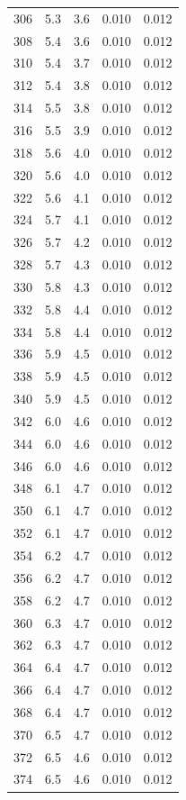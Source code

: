\documentclass[10pt,twocolumn]{article}
\begin{document}
\begin{table}[!t]
\begin{minipage}[t]{0.48\textwidth}
\begin{tabular}{ccccc}
306 & 5.3 & 3.6 & 0.010 & 0.012 \\
308 & 5.4 & 3.6 & 0.010 & 0.012 \\
310 & 5.4 & 3.7 & 0.010 & 0.012 \\
312 & 5.4 & 3.8 & 0.010 & 0.012 \\
314 & 5.5 & 3.8 & 0.010 & 0.012 \\
316 & 5.5 & 3.9 & 0.010 & 0.012 \\
318 & 5.6 & 4.0 & 0.010 & 0.012 \\
320 & 5.6 & 4.0 & 0.010 & 0.012 \\
322 & 5.6 & 4.1 & 0.010 & 0.012 \\
324 & 5.7 & 4.1 & 0.010 & 0.012 \\
326 & 5.7 & 4.2 & 0.010 & 0.012 \\
328 & 5.7 & 4.3 & 0.010 & 0.012 \\
330 & 5.8 & 4.3 & 0.010 & 0.012 \\
332 & 5.8 & 4.4 & 0.010 & 0.012 \\
334 & 5.8 & 4.4 & 0.010 & 0.012 \\
336 & 5.9 & 4.5 & 0.010 & 0.012 \\
338 & 5.9 & 4.5 & 0.010 & 0.012 \\
340 & 5.9 & 4.5 & 0.010 & 0.012 \\
342 & 6.0 & 4.6 & 0.010 & 0.012 \\
344 & 6.0 & 4.6 & 0.010 & 0.012 \\
346 & 6.0 & 4.6 & 0.010 & 0.012 \\
348 & 6.1 & 4.7 & 0.010 & 0.012 \\
350 & 6.1 & 4.7 & 0.010 & 0.012 \\
352 & 6.1 & 4.7 & 0.010 & 0.012 \\
354 & 6.2 & 4.7 & 0.010 & 0.012 \\
356 & 6.2 & 4.7 & 0.010 & 0.012 \\
358 & 6.2 & 4.7 & 0.010 & 0.012 \\
360 & 6.3 & 4.7 & 0.010 & 0.012 \\
362 & 6.3 & 4.7 & 0.010 & 0.012 \\
364 & 6.4 & 4.7 & 0.010 & 0.012 \\
366 & 6.4 & 4.7 & 0.010 & 0.012 \\
368 & 6.4 & 4.7 & 0.010 & 0.012 \\
370 & 6.5 & 4.7 & 0.010 & 0.012 \\
372 & 6.5 & 4.6 & 0.010 & 0.012 \\
374 & 6.5 & 4.6 & 0.010 & 0.012 \\

\end{tabular}
\end{minipage}
\end{table}
\end{document}
